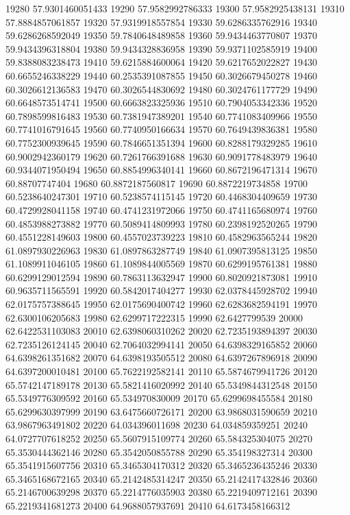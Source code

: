 {19280 57.9301460051433
19290 57.9582992786333
19300 57.9582925438131
19310 57.8884857061857
19320 57.9319918557854
19330 59.6286335762916
19340 59.6286268592049
19350 59.7840648489858
19360 59.9434463770807
19370 59.9434396318804
19380 59.9434328836958
19390 59.9371102585919
19400 59.8388083238473
19410 59.6215884600064
19420 59.6217652022827
19430 60.6655246338229
19440 60.2535391087855
19450 60.3026679450278
19460 60.3026612136583
19470 60.3026544830692
19480 60.3024761177729
19490 60.6648573514741
19500 60.6663823325936
19510 60.7904053342336
19520 60.7898599816483
19530 60.7381947389201
19540 60.7741083409966
19550 60.7741016791645
19560 60.7740950166634
19570 60.7649439836381
19580 60.7752300939645
19590 60.7846651351394
19600 60.8288179329285
19610 60.9002942360179
19620 60.7261766391688
19630 60.9091778483979
19640 60.9344071950494
19650 60.8854996340141
19660 60.8672196471314
19670 60.88707747404
19680 60.8872187560817
19690 60.8872219734858
19700 60.5238640247301
19710 60.5238574115145
19720 60.4468304409659
19730 60.4729928041158
19740 60.4741231972066
19750 60.4741165680974
19760 60.4853988273882
19770 60.5089414809993
19780 60.2398192520265
19790 60.4551228149603
19800 60.4557023739223
19810 60.4582963565244
19820 61.0897930226963
19830 61.0897863287749
19840 61.0907395813125
19850 61.1089911046105
19860 61.1089844005569
19870 60.6299195761381
19880 60.6299129012594
19890 60.7863113632947
19900 60.8020921873081
19910 60.9635711565591
19920 60.5842017404277
19930 62.0378445928702
19940 62.0175757388645
19950 62.0175690400742
19960 62.6283682594191
19970 62.6300106205683
19980 62.6299717222315
19990 62.6427799539
20000 62.6422531103083
20010 62.6398060310262
20020 62.7235193894397
20030 62.7235126124145
20040 62.7064032994141
20050 64.6398329165852
20060 64.6398261351682
20070 64.6398193505512
20080 64.6397267896918
20090 64.6397200010481
20100 65.7622192582141
20110 65.5874679941726
20120 65.5742147189178
20130 65.5821416020992
20140 65.5349844312548
20150 65.5349776309592
20160 65.534970830009
20170 65.6299698455584
20180 65.6299630397999
20190 63.6475660726171
20200 63.9868031590659
20210 63.9867963491802
20220 64.034396011698
20230 64.034859359251
20240 64.0727707618252
20250 65.5607915109774
20260 65.584325304075
20270 65.3530444362146
20280 65.3542050855788
20290 65.354198327314
20300 65.3541915607756
20310 65.3465304170312
20320 65.3465236435246
20330 65.3465168672165
20340 65.2142485314247
20350 65.2142417432846
20360 65.2146700639298
20370 65.2214776035903
20380 65.2219409712161
20390 65.2219341681273
20400 64.9688057937691
20410 64.6173458166312
}
